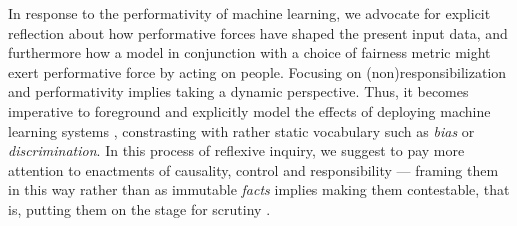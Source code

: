\documentclass[11pt]{article} %
\begin{document}
In response to the performativity of machine learning, we advocate for explicit reflection about how performative forces have shaped the present input data, and furthermore how a model in conjunction with a choice of fairness metric might exert performative force by acting on people. Focusing on (non)responsibilization and performativity implies taking a dynamic perspective. Thus, it becomes imperative to foreground and explicitly model the effects of deploying machine learning systems
 \citep{hu2018short,liu2018delayed,d2020fairness,schwobel2022long}, constrasting with rather static vocabulary such as \textit{bias} or \textit{discrimination}.
In this process of reflexive inquiry, we suggest to pay more attention to enactments of causality, control and responsibility --- framing them in this way rather than as immutable \textit{facts} implies making them contestable, that is, putting them on the stage for scrutiny \citep{glenn2003postmodernism}. 
\end{document}
